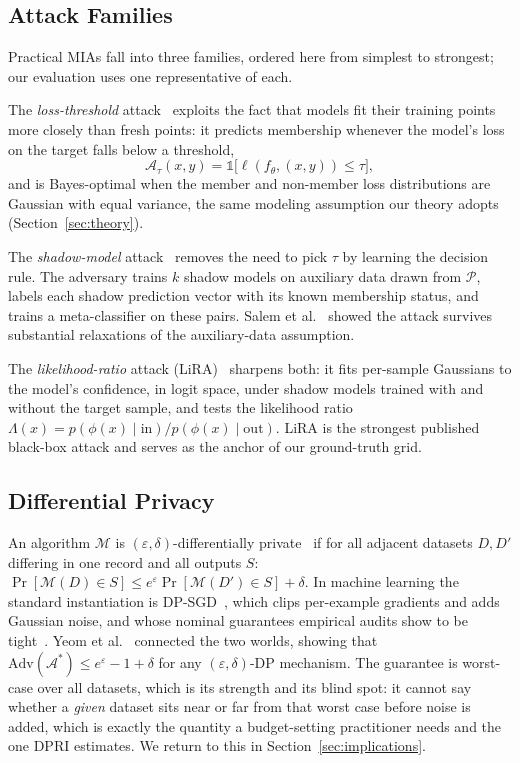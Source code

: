 \subsection{Attack Families}
\label{sec:attack_families}

Practical MIAs fall into three families, ordered here from simplest to
strongest; our evaluation uses one representative of each.

The \emph{loss-threshold} attack~\cite{yeom2018privacy} exploits the
fact that models fit their training points more closely than fresh
points: it predicts membership whenever the model's loss on the target
falls below a threshold,
\begin{equation}
  \mathcal{A}_{\tau}(x,y) = \mathbb{1}\bigl[\ell(f_\theta,(x,y)) \leq \tau\bigr],
\end{equation}
and is Bayes-optimal when the member and non-member loss distributions
are Gaussian with equal variance, the same modeling assumption our
theory adopts (Section~\ref{sec:theory}).

The \emph{shadow-model} attack~\cite{shokri2017membership} removes the
need to pick $\tau$ by learning the decision rule. The adversary trains
$k$ shadow models on auxiliary data drawn from $\mathcal{P}$, labels
each shadow prediction vector with its known membership status, and
trains a meta-classifier on these pairs. Salem et
al.~\cite{salem2019ml} showed the attack survives substantial
relaxations of the auxiliary-data assumption.

The \emph{likelihood-ratio} attack (LiRA)~\cite{carlini2022lira}
sharpens both: it fits per-sample Gaussians to the model's confidence,
in logit space, under shadow models trained with and without the target
sample, and tests the likelihood ratio
$\Lambda(x) = p(\phi(x) \mid \mathrm{in}) / p(\phi(x) \mid \mathrm{out})$.
LiRA is the strongest published black-box attack and serves as the
anchor of our ground-truth grid.

\subsection{Differential Privacy}

An algorithm $\mathcal{M}$ is $(\varepsilon,\delta)$-differentially
private~\cite{dwork2006calibrating,dwork2014algorithmic} if for all
adjacent datasets $D, D'$
differing in one record and all outputs $S$:
$\Pr[\mathcal{M}(D)\in S] \leq e^\varepsilon \Pr[\mathcal{M}(D')\in S] + \delta$.
In machine learning the standard instantiation is
DP-SGD~\cite{abadi2016deep}, which clips per-example gradients and adds
Gaussian noise, and whose nominal guarantees empirical audits show to be
tight~\cite{jagielski2020auditing,nasr2021adversary}.
Yeom et al.~\cite{yeom2018privacy} connected the two worlds, showing
that $\mathrm{Adv}(\mathcal{A}^*) \leq e^\varepsilon - 1 + \delta$ for
any $(\varepsilon,\delta)$-DP mechanism.
The guarantee is worst-case over all datasets, which is its strength
and its blind spot: it cannot say whether a \emph{given} dataset sits
near or far from that worst case before noise is added, which is
exactly the quantity a budget-setting practitioner needs and the one
DPRI estimates. We return to this in Section~\ref{sec:implications}.

